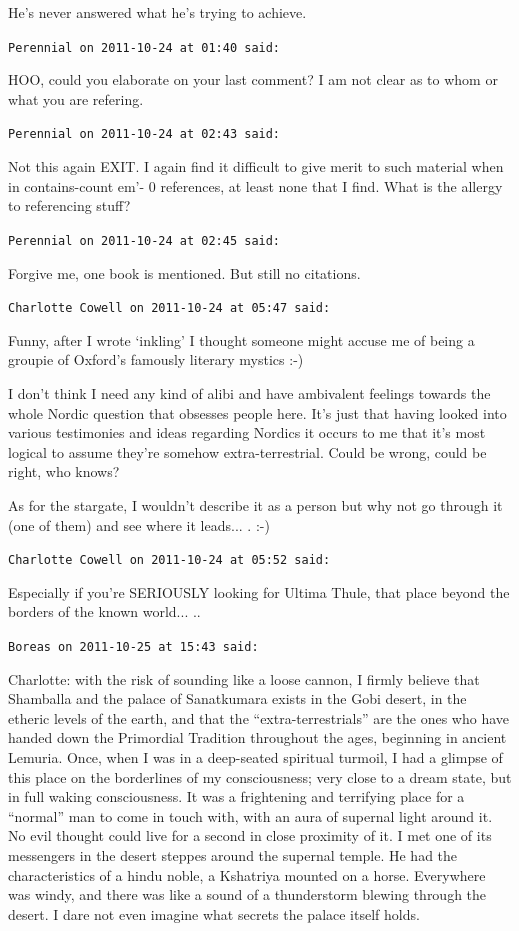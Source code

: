 \begin{footnotesize}
\begin{sffamily}
He's never answered what he's trying to achieve.

\hfill

\texttt{Perennial on 2011-10-24 at 01:40 said:}

HOO, could you elaborate on your last comment? I am not clear as to whom or what you are refering.

\hfill

\texttt{Perennial on 2011-10-24 at 02:43 said:}

Not this again EXIT. I again find it difficult to give merit to such material when in contains-count em'- 0 references, at least none that I find. What is the allergy to referencing stuff?

\hfill

\texttt{Perennial on 2011-10-24 at 02:45 said:}

Forgive me, one book is mentioned. But still no citations.

\hfill

\texttt{Charlotte Cowell on 2011-10-24 at 05:47 said:}

Funny, after I wrote `inkling' I thought someone might accuse me of being a groupie of Oxford's famously literary mystics :-)

I don't think I need any kind of alibi and have ambivalent feelings towards the whole Nordic question that obsesses people here. It's just that having looked into various testimonies and ideas regarding Nordics it occurs to me that it's most logical to assume they're somehow extra-terrestrial. Could be wrong, could be right, who knows?

As for the stargate, I wouldn't describe it as a person but why not go through it (one of them) and see where it leads... . :-)

\hfill

\texttt{Charlotte Cowell on 2011-10-24 at 05:52 said:}

Especially if you're SERIOUSLY looking for Ultima Thule, that place beyond the borders of the known world... ..

\hfill

\texttt{Boreas on 2011-10-25 at 15:43 said:}

Charlotte: with the risk of sounding like a loose cannon, I firmly believe that Shamballa and the palace of Sanatkumara exists in the Gobi desert, in the etheric levels of the earth, and that the ``extra-terrestrials'' are the ones who have handed down the Primordial Tradition throughout the ages, beginning in ancient Lemuria. Once, when I was in a deep-seated spiritual turmoil, I had a glimpse of this place on the borderlines of my consciousness; very close to a dream state, but in full waking consciousness. It was a frightening and terrifying place for a ``normal'' man to come in touch with, with an aura of supernal light around it. No evil thought could live for a second in close proximity of it. I met one of its messengers in the desert steppes around the supernal temple. He had the characteristics of a hindu noble, a Kshatriya mounted on a horse. Everywhere was windy, and there was like a sound of a thunderstorm blewing through the desert. I dare not even imagine what secrets the palace itself holds.


\end{sffamily}
\end{footnotesize}
